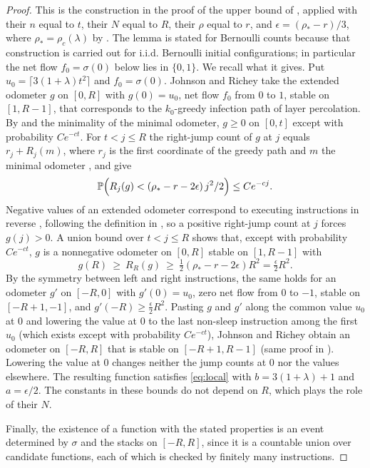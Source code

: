 \documentclass[11pt]{amsart}
\theoremstyle{remark}
\renewcommand{\Pr}{\mathbb P}
\begin{document}
\begin{proof}
This is the construction in the proof of the upper bound of \cite[Theorem~1.1]{JR}, applied with their $n$
equal to $t$, their $N$ equal to $R$, their $\rho$ equal to $r$, and $\epsilon=(\rho_*-r)/3$, where $\rho_*=\rho_c(\lambda)$
by \cite{HJJ}. The lemma is stated for Bernoulli counts because that construction is carried out for i.i.d.
Bernoulli initial configurations; in particular the net flow $f_0=\sigma(0)$ below lies in $\{0,1\}$. We recall what it
gives. Put $u_0=\lceil 3(1+\lambda)t^2\rceil$ and $f_0=\sigma(0)$. Johnson and Richey take
the extended odometer $g$ on $[0,R]$ with $g(0)=u_0$, net flow $f_0$ from $0$ to $1$, stable on $[1,R-1]$, that
corresponds to the $k_0$-greedy infection path of layer percolation. By \cite[Lemma~3.2(a)]{JR} and the minimality of the
minimal odometer, $g\ge0$ on $[0,t]$ except with probability $Ce^{-ct}$. For $t<j\le R$ the right-jump count of $g$ at $j$
equals $r_j+R_j(m)$, where $r_j$ is the first coordinate of the greedy path and $m$ the minimal odometer
\cite[Proposition~2.1]{JR}, and \cite[Lemmas~3.2(b) and~3.3]{JR} give
\[
\Pr\Bigl(R_j(g)<(\rho_*-r-2\epsilon)\,j^2/2\Bigr)\le Ce^{-cj}.
\]
Negative values of an extended odometer correspond to executing instructions in reverse \cite[Section~2]{JR}, following the definition in \cite{HJJ}, so a
positive right-jump count at $j$ forces $g(j)>0$. A union bound over $t<j\le R$ shows that, except with probability $Ce^{-ct}$, $g$ is a nonnegative odometer on $[0,R]$
stable on $[1,R-1]$ with
\[
g(R)\ \ge\ R_R(g)\ \ge\ \tfrac12(\rho_*-r-2\epsilon)R^2=\tfrac{\epsilon}{2}R^2 .
\]
By the symmetry between left and right instructions, the same holds for an odometer $g'$ on $[-R,0]$ with $g'(0)=u_0$,
zero net flow from $0$ to $-1$, stable on $[-R+1,-1]$, and $g'(-R)\ge\frac{\epsilon}{2}R^2$. Pasting $g$ and $g'$ along
the common value $u_0$ at $0$ and lowering the value at $0$ to the last non-sleep instruction among the first $u_0$
(which exists except with probability $Ce^{-ct}$), Johnson and Richey obtain an odometer on $[-R,R]$ that is stable on
$[-R+1,R-1]$ (same proof in \cite{JR}). Lowering the value at $0$ changes neither the jump counts at $0$ nor the values elsewhere.
The resulting function satisfies \eqref{eq:local} with $b=3(1+\lambda)+1$ and $a=\epsilon/2$. The constants in these
bounds do not depend on $R$, which plays the role of their $N$.

Finally, the existence of a function with the stated properties is an event determined by $\sigma$ and the stacks on
$[-R,R]$, since it is a countable union over candidate functions, each of which is checked by finitely many
instructions.
\end{proof}
\end{document}
